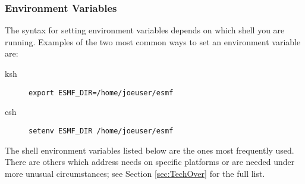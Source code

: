 \subsubsection{Environment Variables}

The syntax for setting environment variables depends on which shell
you are running.  Examples of the two most common ways to set 
an environment variable are:
\begin{description}
\item[ksh] {\tt  export ESMF\_DIR=/home/joeuser/esmf}
\item[csh] {\tt  setenv ESMF\_DIR /home/joeuser/esmf}
\end{description}

The shell environment variables listed below are the ones most
frequently used.  There are others which address needs on specific
platforms or are needed under more unusual circumstances; 
see Section \ref{sec:TechOver} for the full list.  
